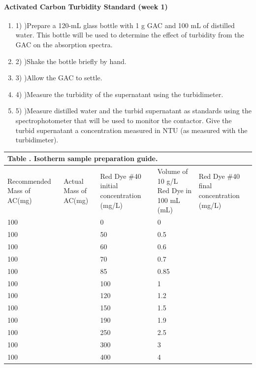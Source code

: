 \documentclass{article} %
\begin{document}
\noindent 
\paragraph{Activated Carbon Turbidity Standard (week 1)}

\noindent \begin{enumerate}
\item 1) )Prepare a 120-mL glass bottle with 1 g GAC and 100 mL of distilled water. This bottle will be used to determine the effect of turbidity from the GAC on the absorption spectra.

\noindent \item 2) )Shake the bottle briefly by hand.

\noindent \item 3) )Allow the GAC to settle.

\noindent \item 4) )Measure the turbidity of the supernatant using the turbidimeter.

\noindent \item 5) )Measure distilled water and the turbid supernatant as standards using the spectrophotometer that will be used to monitor the contactor. Give the turbid supernatant a concentration measured in NTU (as measured with the turbidimeter).
\end{enumerate}

\begin{tabular}{|p{0.6in}|p{0.5in}|p{0.6in}|p{0.5in}|p{0.6in}|} \hline 
\multicolumn{5}{|p{1in}|}{Table \label{ZEqnNum208070}. Isotherm sample preparation guide.} \\ \hline 
Recommended Mass of AC(mg) & Actual Mass of AC\newline (mg) & Red Dye \#40 initial concentration (mg/L) & Volume of 10 g/L Red Dye in 100 mL (mL) & Red Dye \#40 final concentration (mg/L) \\ \hline 
100 &  & 0 & 0 &  \\ \hline 
100 &  & 50 & 0.5 &  \\ \hline 
100 &  & 60 & 0.6 &  \\ \hline 
100 &  & 70 & 0.7 &  \\ \hline 
100 &  & 85 & 0.85 &  \\ \hline 
100 &  & 100 & 1 &  \\ \hline 
100 &  & 120 & 1.2 &  \\ \hline 
100 &  & 150 & 1.5 &  \\ \hline 
100 &  & 190 & 1.9 &  \\ \hline 
100 &  & 250 & 2.5 &  \\ \hline 
100 &  & 300 & 3 &  \\ \hline 
100 &  & 400 & 4 &  \\ \hline 
\end{tabular}
\end{document}
